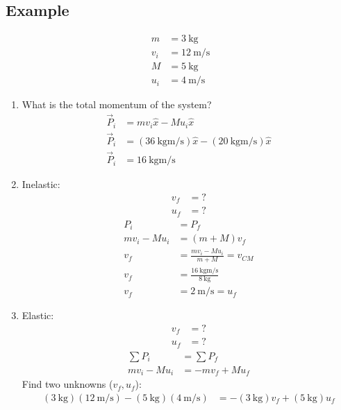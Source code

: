 \documentclass{article}
\begin{document}
\subsection{Example}

\begin{align*}
	m & = \SI{3}{\kilogram} \\
	v_i & = \SI{12}{\meter \per \second} \\
	M & = \SI{5}{\kilogram} \\
	u_i & = \SI{4}{\meter \per \second}
\end{align*}
\begin{enumerate}[label = \textbf{\arabic*)}]
	\item What is the total momentum of the system?
		\begin{align*}
			\vec{P}_i & = mv_i \hat{x} - Mu_i \hat{x} \\
			\vec{P}_i & = (\SI{36}{\kilogram \meter \per \second}) \hat{x} - (\SI{20}{\kilogram \meter \per \second}) \hat{x} \\
			\vec{P}_i & = \SI{16}{\kilogram \meter \per \second}
		\end{align*}
	\item Inelastic:
		\begin{align*}
			v_f & = ? \\
			u_f & = ?
		\end{align*}
		\begin{align*}
			P_i & = P_f \\
			mv_i - Mu_i & = (m + M)v_f \\
			v_f & = \frac{mv_i - Mu_i}{m + M} = v_{CM} \\
			v_f & = \frac{\SI{16}{\kilogram \meter \per \second}}{\SI{8}{\kilogram}} \\
			v_f & = \SI{2}{\meter \per \second} = u_f
		\end{align*}
	\item Elastic:
		\begin{align*}
			v_f & = ? \\
			u_f & = ?
		\end{align*}
		\begin{align*}
			\sum P_i & = \sum P_f \\
			mv_i - Mu_i & = -mv_f + Mu_f
		\end{align*}
		Find two unknowns ($ v_f, u_f $):
		\begin{align*}
			(\SI{3}{\kilogram})(\SI{12}{\meter \per \second}) - (\SI{5}{\kilogram})(\SI{4}{\meter \per \second}) & = -(\SI{3}{\kilogram})v_f + (\SI{5}{\kilogram})u_f \\

\end{align*}
\end{enumerate}
\end{document}
